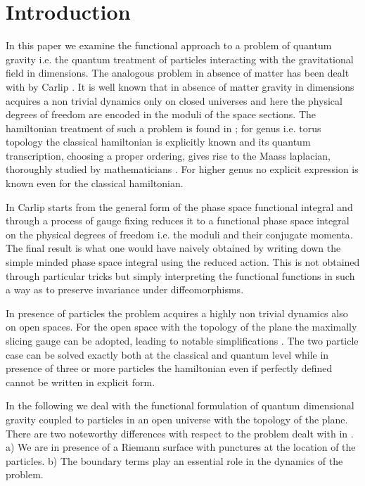 \documentclass[a4paper,12pt]{article}
\begin{document}
\section{Introduction}\label{Introduction}
In this paper we examine the functional approach to a problem of
quantum gravity i.e. the quantum treatment of \coordHE{} particles
interacting with the gravitational field in \coordHE{} dimensions. The analogous
problem in absence of matter has been dealt with by Carlip
\cite {carlip}. It is well known that in absence of matter gravity in
\coordHE{} dimensions acquires a non trivial dynamics only on closed
universes and here the physical degrees of freedom are encoded in the
moduli of the space sections. The hamiltonian treatment of such a
problem is found in \cite{moncrief,hosoya,carlip2}; for genus \coordHE{} i.e. torus
topology the classical hamiltonian is explicitly known and its
quantum transcription, choosing a proper ordering, gives rise to the
Maass laplacian, thoroughly studied by mathematicians
\cite{fayterras}. For higher 
genus no explicit expression is known even for the classical
hamiltonian.

In \cite{carlip} Carlip starts from the general form of the
phase space functional integral and through a process of gauge fixing
reduces it to a functional phase space integral on the physical
degrees of freedom i.e. the moduli and their conjugate momenta. The
final result is what one would have naively obtained by writing down
the simple minded phase space integral using the reduced action. This
is not obtained through particular tricks but simply interpreting the
functional \myHighlight{$\delta$}\coordHE{} functions in such a way as to preserve invariance
under diffeomorphisms. 

In presence of particles the problem acquires a highly non trivial
dynamics also on open spaces. For the open space with the
topology of the plane the maximally slicing gauge can be adopted,
leading to notable simplifications \cite{BCVW,MS,CMS1}. The two particle
case can be solved exactly both at the classical and quantum level
while in presence of three or more particles the hamiltonian even if
perfectly defined \cite{CMS1,CMS3} cannot be written in explicit form. 

In the following we deal with the functional formulation of quantum
\coordHE{} dimensional gravity coupled to particles in an open universe
with the topology of the plane. There are two noteworthy differences
with respect to the problem dealt with in \cite{carlip}. a) We are in
presence of a Riemann surface with punctures at the location of the
particles. b) The boundary terms play an essential role in the
dynamics of the problem.
\end{document}
